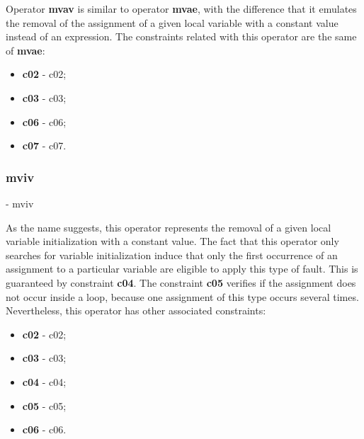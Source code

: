 	Operator \textbf{\ac{mvav}} is similar to operator \textbf{\ac{mvae}}, with the difference that it emulates the removal of the assignment of a given local variable with a constant value instead of an expression. The constraints related with this operator are the same of \textbf{\ac{mvae}}:

	\begin{itemize}
		\item \textbf{\acs{c02}} - \Acl{c02};
		\item \textbf{\acs{c03}} - \Acl{c03};
		\item \textbf{\acs{c06}} - \Acl{c06};
		\item \textbf{\acs{c07}} - \Acl{c07}.
	\end{itemize}

	\subsubsection{\textbf{\acs{mviv}}} - \Acl{mviv}

	As the name suggests, this operator represents the removal of a given local variable initialization with a constant value. The fact that this operator only searches for variable initialization induce that only the first occurrence of an assignment to a particular variable are eligible to apply this type of fault. This is guaranteed by constraint \textbf{\acs{c04}}. The constraint \textbf{\acs{c05}} verifies if the assignment does not occur inside a loop, because one assignment of this type occurs several times. Nevertheless, this operator has other associated constraints:

	\begin{itemize}
		\item \textbf{\acs{c02}} - \Acl{c02};
		\item \textbf{\acs{c03}} - \Acl{c03};
		\item \textbf{\acs{c04}} - \Acl{c04};
		\item \textbf{\acs{c05}} - \Acl{c05};
		\item \textbf{\acs{c06}} - \Acl{c06}.
	\end{itemize}




